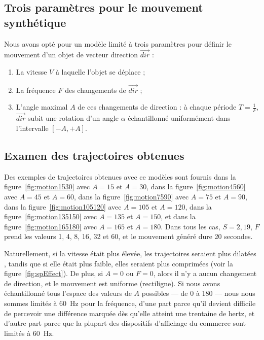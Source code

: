     \subsection{Trois paramètres pour le mouvement synthétique}
    Nous avons opté pour un modèle limité à trois paramètres pour définir le mouvement d'un objet de vecteur direction $\vec{dir}$ :
    \begin{enumerate}
    	\item La vitesse $V$ à laquelle l'objet se déplace ;
    	\item La fréquence $F$ des changements de $\vec{dir}$ ;
    	\item L'angle maximal $A$ de ces changements de direction : à chaque période $T = \frac{1}{F}$, $\vec{dir}$ subit une rotation d'un angle $\alpha$ échantillonné uniformément dans l'intervalle $[-A, +A]$.
    \end{enumerate}
    
    \subsection{Examen des trajectoires obtenues}
    Des exemples de trajectoires obtenues avec ce modèles sont fournis dans la figure~\ref{fig:motion1530} avec $A=15$ et $A=30$, dans la figure~\ref{fig:motion4560} avec $A=45$ et $A=60$, dans la figure~\ref{fig:motion7590} avec $A=75$ et $A=90$, dans la figure~\ref{fig:motion105120} avec $A=105$ et $A=120$, dans la figure~\ref{fig:motion135150} avec $A=135$ et $A=150$, et dans la figure~\ref{fig:motion165180} avec $A=165$ et $A=180$. Dans tous les cas, $S=2,19$, $F$ prend les valeurs 1, 4, 8, 16, 32 et 60, et le mouvement généré dure 20 secondes.
    
    Naturellement, si la vitesse était plus élevée, les trajectoires seraient plus \og dilatées \fg{}, tandis que si elle était plus faible, elles seraient plus \og comprimées \fg{} (voir la figure~\ref{fig:spEffect}). De plus, si $A=0$ ou $F=0$, alors il n'y a aucun changement de direction, et le mouvement est uniforme (rectiligne). Si nous avons échantillonné tous l'espace des valeurs de $A$ possibles --- de 0 à 180\textdegree{} --- nous nous sommes limités à 60~Hz pour la fréquence, d'une part parce qu'il devient difficile de percevoir une différence marquée dès qu'elle atteint une trentaine de hertz, et d'autre part parce que la plupart des dispositifs d'affichage du commerce sont limités à 60~Hz.    
    
